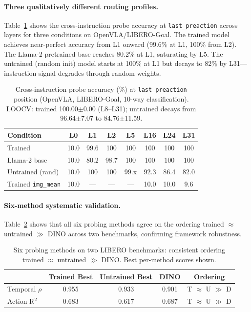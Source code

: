 \documentclass[letterpaper]{article}
\begin{document}
\paragraph{Three qualitatively different routing profiles.}
Table~\ref{tab:cross-instruction} shows the cross-instruction probe accuracy at \texttt{last\_preaction} across layers for three conditions on OpenVLA/LIBERO-Goal.
The trained model achieves near-perfect accuracy from L1 onward (99.6\% at L1, 100\% from L2).
The Llama-2 pretrained base reaches 80.2\% at L1, saturating by L5.
The untrained (random init) model starts at 100\% at L1 but decays to 82\% by L31---instruction signal degrades through random weights.

\begin{table}[t]
\centering
\caption{Cross-instruction probe accuracy (\%) at \texttt{last\_preaction} position (OpenVLA, LIBERO-Goal, 10-way classification). LOOCV: trained 100.00$\pm$0.00 (L8--L31); untrained decays from 96.64$\pm$7.07 to 84.76$\pm$11.59.}
\label{tab:cross-instruction}
\small
\begin{tabular}{lccccccc}
\toprule
Condition & L0 & L1 & L2 & L5 & L16 & L24 & L31 \\
\midrule
Trained          & 10.0 & 99.6 & 100 & 100 & 100  & 100  & 100 \\
Llama-2 base     & 10.0 & 80.2 & 98.7 & 100 & 100  & 100  & 100 \\
Untrained (rand) & 10.0 & 100  & 100 & 99.x & 92.3 & 86.4 & 82.0 \\
\midrule
Trained \texttt{img\_mean} & 10.0 & --- & --- & --- & 10.0 & 10.0 & 9.6 \\
\bottomrule
\end{tabular}
\end{table}

\paragraph{Six-method systematic validation.}
Table~\ref{tab:six-methods} shows that all six probing methods agree on the ordering trained $\approx$ untrained $\gg$ DINO across two benchmarks, confirming framework robustness.

\begin{table}[t]
\centering
\caption{Six probing methods on two LIBERO benchmarks: consistent ordering trained $\approx$ untrained $\gg$ DINO. Best per-method scores shown.}
\label{tab:six-methods}
\small
\begin{tabular}{lcccc}
\toprule
 & Trained Best & Untrained Best & DINO & Ordering \\
\midrule
Temporal $\rho$ & 0.955 & 0.933 & 0.901 & T $\approx$ U $\gg$ D \\
Action R$^2$ & 0.683 & 0.617 & 0.687 & T $\approx$ U $\gg$ D \\
\bottomrule
\end{tabular}
\end{table}
\end{document}
